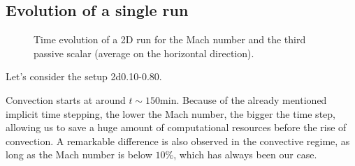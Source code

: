 \subsection{Evolution of a single run}
\begin{figure}[t!]
      \centering
     \centering
	\hfill
	\caption{Time evolution of a 2D run for the Mach number and the third passive scalar (average on the horizontal direction).}
	\label{fig:2dsinglefirst}
\end{figure}
Let's consider the setup 2d0.10-0.80. 

Convection starts at around $t \sim 150 \mathrm{min}$. Because of the already mentioned implicit time stepping, the lower the Mach number, the bigger the time step, allowing us to save a huge amount of computational resources before the rise of convection. A remarkable difference is also observed in the convective regime, as long as the Mach number is below $10 \%$, which has always been our case.

